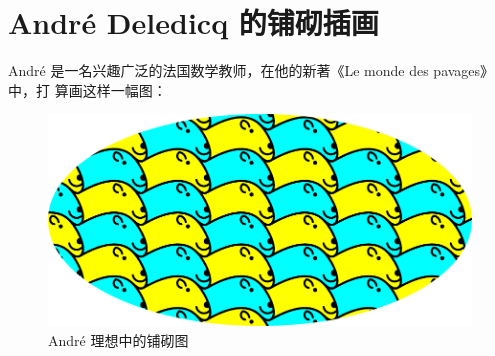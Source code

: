 
\chapter{André Deledicq 的铺砌插画}

André 是一名兴趣广泛的法国数学教师，在他的新著《Le monde des pavages》中，打
算画这样一幅图：
\begin{figure}[H]
  \centering
  \includegraphics{tiling.pdf}
  \caption{André 理想中的铺砌图}
  \label{fig:tiling}
\end{figure}
\endinput

